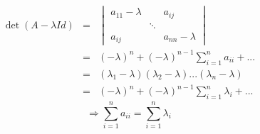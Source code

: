 \begin{dem}
	\begin{eqnarray*}
	\det(A-\lambda Id)&=&\begin{vmatrix} a_{11}-\lambda & &a_{ij} \\ & \ddots & \\ a_{ij} & & a_{nn}-\lambda \end{vmatrix}\\
			&=&(-\lambda)^n + (-\lambda)^{n-1}\sum_{i=1}^n a_{ii} + ... \\
			&=&(\lambda_1-\lambda)(\lambda_2-\lambda)...(\lambda_n-\lambda)\\
			&=&(-\lambda)^n+(-\lambda)^{n-1}\sum_{i=1}^n \lambda_i + ...
	\end{eqnarray*}
	\[\Rightarrow \sum_{i=1}^n a_{ii}=\sum_{i=1}^n \lambda_i\]
\end{dem}


